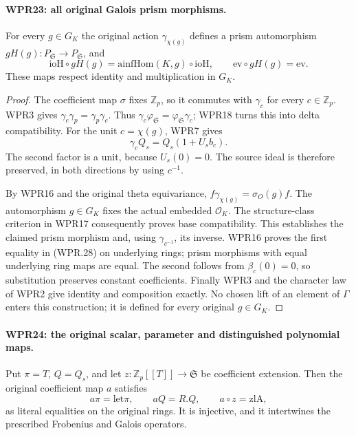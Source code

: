 \documentclass[11pt,a4paper]{article}
\numberwithin{equation}{section}
\theoremstyle{remark}\newtheorem{remark}[theorem]{Remark}
\begin{document}
\paragraph{WPR23: all original Galois prism morphisms.}
\label{claim:WPR23}
For every $g\in G_K$ the original action
$\gamma_{\chi(g)}$ defines a prism automorphism
$gH(g):P_{\mathfrak S}\to P_{\mathfrak S}$, and
\[
 \mathrm{ioH}\circ gH(g)=\mathrm{ainfHom}(K,g)\circ\mathrm{ioH},
 \qquad \mathrm{ev}\circ gH(g)=\mathrm{ev}.
 \tag{WPR.28}
\]
These maps respect identity and multiplication in $G_K$.

\begin{proof}
The coefficient map $\sigma$ fixes $\mathbb Z_p$, so it commutes
with $\gamma_c$ for every $c\in\mathbb Z_p$. WPR3 gives
$\gamma_c\gamma_p=\gamma_p\gamma_c$. Thus
$\gamma_c\varphi_{\mathfrak S}=\varphi_{\mathfrak S}\gamma_c$;
WPR18 turns this into delta compatibility. For the unit
$c=\chi(g)$, WPR7 gives
\[
              \gamma_c Q_s=Q_s(1+U_s b_c).
\]
The second factor is a unit, because $U_s(0)=0$. The source
ideal is therefore preserved, in both directions by using
$c^{-1}$.

By WPR16 and the original theta equivariance,
$f\gamma_{\chi(g)}=\sigma_O(g)f$. The automorphism $g\in G_K$
fixes the actual embedded $\mathcal O_K$. The structure-class
criterion in WPR17 consequently proves base compatibility.
This establishes the claimed prism morphism and, using
$\gamma_{c^{-1}}$, its inverse. WPR16 proves the first equality
in (WPR.28) on underlying rings; prism morphisms with equal
underlying ring maps are equal. The second follows from
$\beta_c(0)=0$, so substitution preserves constant coefficients.
Finally WPR3 and the character law of WPR2 give identity and
composition exactly. No chosen lift of an element of $\Gamma$
enters this construction; it is defined for every original
$g\in G_K$.
\end{proof}

\paragraph{WPR24: the original scalar, parameter and distinguished polynomial maps.}
\label{claim:WPR24}
Put $\pi=T$, $Q=Q_s$, and let
$z:\mathbb Z_p[[T]]\to\mathfrak S$ be coefficient extension.
Then the original coefficient map $a$ satisfies
\[
 a\pi=\mathrm{let}\pi,\qquad aQ=R.Q,\qquad
 a\circ z=\mathrm{zlA},
 \tag{WPR.29}
\]
as literal equalities on the original rings. It is injective,
and it intertwines the prescribed Frobenius and Galois operators.
\end{document}

